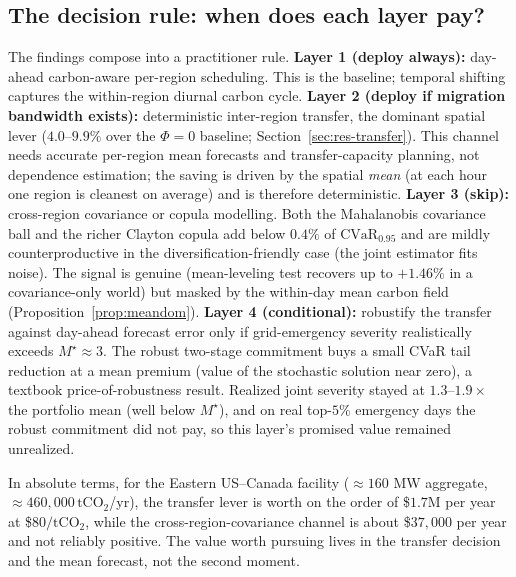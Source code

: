 \documentclass[12pt]{article}
\newcommand{\CVaR}{\mathrm{CVaR}}
\begin{document}
\subsection{The decision rule: when does each layer pay?}\label{sec:practical}
The findings compose into a practitioner rule. \textbf{Layer 1 (deploy always):}
day-ahead carbon-aware per-region scheduling. This is the baseline; temporal shifting
captures the within-region diurnal carbon cycle. \textbf{Layer 2 (deploy if migration
bandwidth exists):} deterministic inter-region transfer, the dominant spatial lever
($4.0$--$9.9\%$ over the $\Phi=0$ baseline;
Section~\ref{sec:res-transfer}). This channel needs accurate per-region mean forecasts
and transfer-capacity planning, not dependence estimation; the saving is driven by the
spatial \emph{mean} (at each hour one region is cleanest on average) and is therefore
deterministic. \textbf{Layer 3 (skip):} cross-region covariance or copula modelling. Both
the Mahalanobis covariance ball and the richer Clayton copula add below $0.4\%$ of
$\CVaR_{0.95}$ and are mildly counterproductive in the diversification-friendly case
(the joint estimator fits noise). The signal is genuine (mean-leveling test recovers up to
$+1.46\%$ in a covariance-only world) but masked by the within-day mean carbon field
(Proposition~\ref{prop:meandom}). \textbf{Layer 4 (conditional):} robustify the
transfer against day-ahead forecast error only if grid-emergency severity realistically
exceeds $M^\star\approx3$. The robust two-stage commitment buys a small CVaR tail
reduction at a mean premium (value of the stochastic solution near zero), a textbook
price-of-robustness result. Realized joint severity stayed at $1.3$--$1.9\times$ the
portfolio mean (well below $M^\star$), and on real top-$5\%$ emergency days the robust
commitment did not pay, so this layer's promised value remained unrealized.

In absolute terms, for the Eastern US--Canada facility ($\approx160$ MW aggregate,
$\approx460{,}000\,\text{tCO}_2$/yr), the transfer lever is worth on the order of
\$$1.7$M per year at \$$80/\text{tCO}_2$, while the cross-region-covariance channel is
about \$$37{,}000$ per year and not reliably positive. The value worth pursuing lives
in the transfer decision and the mean forecast, not the second moment.
\end{document}
